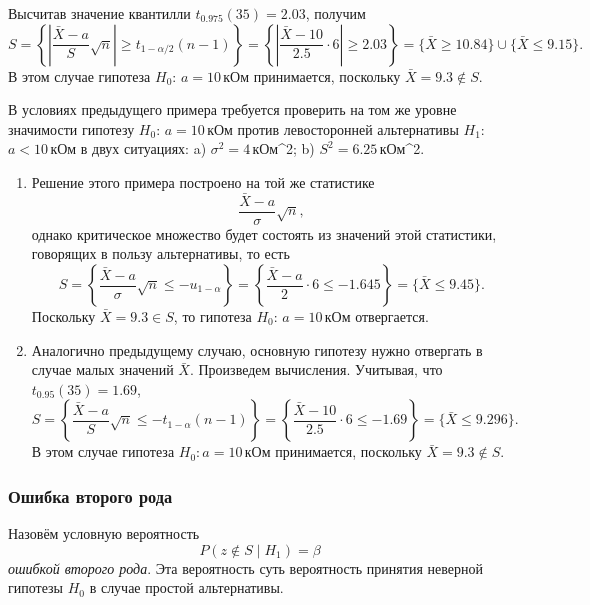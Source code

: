 \begin{ex}
\begin{solution}
\begin{enumerate}[label=\alph*)]
      Высчитав значение квантилли $ t_{0.975}(35) = 2.03 $, получим 
      \[
          S = \left\{ \left| \frac{\bar X - a}{S}\sqrt n \right| \geqslant
          t_{1-\alpha/2}(n-1) \right\} = \left\{ \left| \frac{\bar X - 10}{2.5}\cdot 6
          \right| \geqslant 2.03 \right\} = \{\bar X \geqslant 10.84\} \cup \{\bar X
          \leqslant 9.15\}.
      \]
      В этом случае гипотеза $ H_0 $: $ a = 10 $\,кОм принимается, поскольку $ \bar X
      = 9.3 \notin S$.
    \end{enumerate}

  \end{solution}
\end{ex}

\begin{ex}\label{ex:2}
	В условиях предыдущего примера требуется проверить на том же уровне значимости
	гипотезу $ H_0 $: $ a = 10 $\,кОм против левосторонней альтернативы $ H_1 $:
	$ a < 10 $\,кОм в двух ситуациях: a) $ \sigma^2 = 4 $\,кОм^2; b) $ S^2 = 6.25
	$\,кОм^2.
	\begin{solution}
		\begin{enumerate}[label=\alph*)]
			\item\label{enum:1} Решение этого примера  построено на той же статистике 
			\[
					\frac{\bar X - a}{\sigma}\sqrt n,
			\]
			однако критическое множество будет состоять из значений этой статистики,
			говорящих в пользу альтернативы, то есть 
			\[
				S = \left\{ \frac{\bar X - a}{\sigma}\sqrt n \leqslant - u_{1-\alpha}
				\right\} = \left\{ \frac{\bar X - a}{2} \cdot 6 \leqslant - 1.645
				\right\} = \{\bar X \leqslant 9.45 \}.
			\]
		Поскольку $ \bar X = 9.3 \in S $, то гипотеза $ H_0 $: $ a = 10 $\,кОм
		отвергается.	
	\item Аналогично предыдущему случаю, основную гипотезу нужно отвергать в случае малых 
		значений $\bar X$. Произведем вычисления. Учитывая, что $ t_{0.95}(35) = 1.69 $,
	\[
		S = \left\{ \frac{\bar X - a}{S}\sqrt n \leqslant -t_{1-\alpha}(n-1)
		\right\} = \left\{ \frac{\bar X - 10}{2.5}\cdot 6 \leqslant -1.69 \right\} =
		\{\bar X \leqslant 9.296\}.
	\]
	В этом случае гипотеза $ H_0: a = 10 $\,кОм принимается, поскольку $ \bar X =
	9.3 \notin S$.
		\end{enumerate}

	\end{solution}
\end{ex}

\subsubsection{Ошибка второго рода}
\begin{definition}
Назовём условную вероятность
\[
	P(z\notin S \mid H_1) = \beta
\]
\emph{ошибкой второго рода}. Эта вероятность суть вероятность принятия неверной
гипотезы $ H_0 $ в случае простой альтернативы.
\end{definition}

